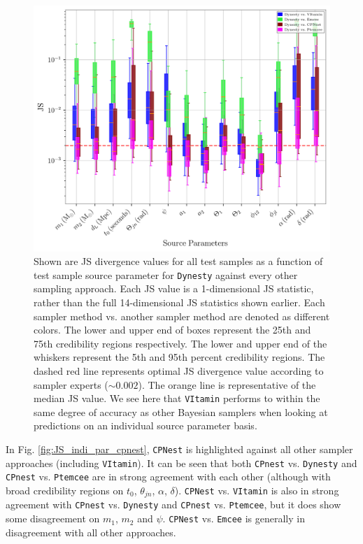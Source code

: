 \begin{figure}
    \includegraphics[width=\columnwidth]{figures/JS_IndiPar_dynesty_nature_paper.png}
    \caption[JS divergences of individual source parameters for \texttt{Dynesty} against all other approaches.]{\label{fig:JS_indi_par_dynesty} Shown are JS divergence values for all test samples as a function of test sample source parameter for \texttt{Dynesty} against every other sampling approach. Each JS value is a 1-dimensional JS statistic, rather than the full 14-dimensional JS statistics shown earlier. Each sampler method vs. another sampler method are denoted as different colors. The lower and upper end of boxes represent the 25th and 75th credibility regions respectively. The lower and upper end of the whiskers represent the 5th and 95th percent credibility regions. The dashed red line represents optimal JS divergence value according to sampler experts ($\sim 0.002$). The orange line is representative of the median JS value. We see here that \texttt{VItamin} performs to within the same degree of accuracy as other Bayesian samplers when looking at predictions on an individual source parameter basis.}
\end{figure}

%
%

In Fig. \ref{fig:JS_indi_par_cpnest}, \texttt{CPNest} is highlighted against 
all other sampler approaches (including \texttt{VItamin}). It can be seen 
that both \texttt{CPnest} vs. \texttt{Dynesty} and \texttt{CPnest} vs. 
\texttt{Ptemcee} are in strong agreement with each other (although with broad 
credibility regions on $t_0$, $\theta_{jn}$, $\alpha$, $\delta$). \texttt{CPNest} 
vs. \texttt{VItamin} is also in strong agreement with \texttt{CPnest} vs. \texttt{Dynesty} and \texttt{CPnest} vs. \texttt{Ptemcee}, but it does show some 
disagreement on $m_1$, $m_2$ and $\psi$. \texttt{CPNest} vs. \texttt{Emcee} is 
generally in disagreement with all other approaches.

